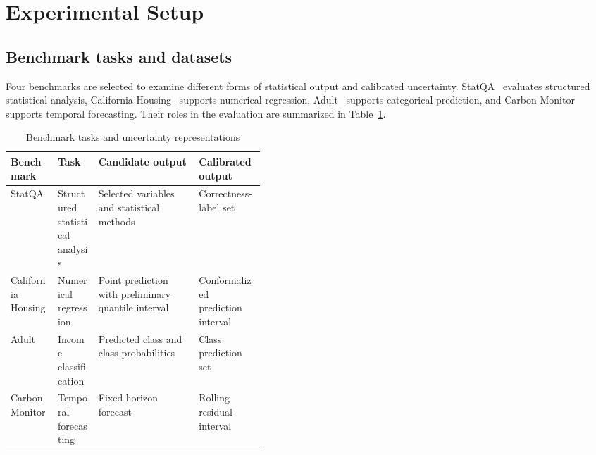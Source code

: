 \documentclass[preprint,12pt,authoryear]{elsarticle}
\begin{document}
\section{Experimental Setup}
\label{sec:experimental_setup}

\subsection{Benchmark tasks and datasets}
\label{sec:benchmark_tasks}

Four benchmarks are selected to examine different forms of statistical output and calibrated uncertainty. StatQA~\citep{zhu2024large} evaluates structured statistical analysis, California Housing~\citep{pace1997sparse} supports numerical regression, Adult~\citep{becker1996adult} supports categorical prediction, and Carbon Monitor~\citep{liu2020carbon} supports temporal forecasting. Their roles in the evaluation are summarized in Table~\ref{tab:benchmark_tasks}.

\begin{table}[H]
    \centering
    \caption{Benchmark tasks and uncertainty representations}
    \label{tab:benchmark_tasks}
    \small
    \setlength{\tabcolsep}{4pt}
    \renewcommand{\arraystretch}{1.2}

    \begin{tabularx}{\linewidth}{
        @{}
        l
        >{\raggedright\arraybackslash}p{0.16\linewidth}
        >{\raggedright\arraybackslash}X
        >{\raggedright\arraybackslash}p{0.26\linewidth}
        @{}
    }
        \toprule
        \textbf{Benchmark}
        & \textbf{Task}
        & \textbf{Candidate output}
        & \textbf{Calibrated output} \\
        \midrule

        StatQA
        & Structured statistical analysis
        & Selected variables and statistical methods
        & Correctness-label set \\

        California Housing
        & Numerical regression
        & Point prediction with preliminary quantile interval
        & Conformalized prediction interval \\

        Adult
        & Income classification
        & Predicted class and class probabilities
        & Class prediction set \\

        Carbon Monitor
        & Temporal forecasting
        & Fixed-horizon forecast
        & Rolling residual interval \\

        \bottomrule
    \end{tabularx}
\end{table}
\end{document}
